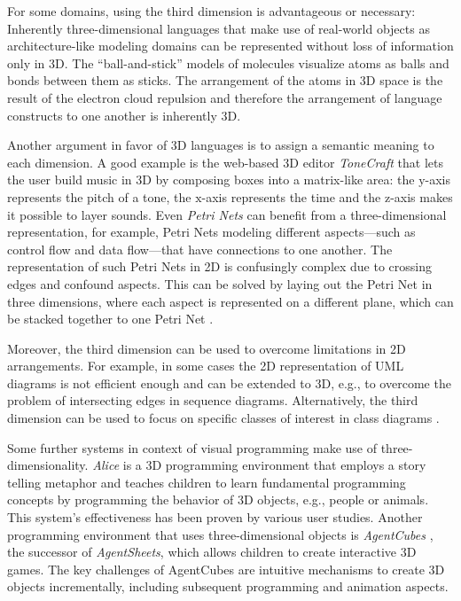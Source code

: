 \documentclass[a4paper]{article}
\begin{document}
For some domains, using the third dimension is advantageous or necessary: Inherently three-dimensional languages that make use of real-world objects as architecture-like modeling domains can be represented without loss of information only in 3D. The ``ball-and-stick'' models of molecules visualize atoms as balls and bonds between them as sticks. The arrangement of the atoms in 3D space is the result of the electron cloud repulsion and therefore the arrangement of language constructs to one another is inherently 3D.

Another argument in favor of 3D languages is to assign a semantic meaning to each dimension. A good example is the web-based 3D editor \emph{ToneCraft} \cite{tonecraft} that lets the user build music in 3D by composing boxes into a matrix-like area: the $\mathrm{y}$-axis represents the pitch of a tone, the $\mathrm{x}$-axis represents the time and the $\mathrm{z}$-axis makes it possible to layer sounds. Even \emph{Petri Nets} can benefit from a three-dimensional representation, for example, Petri Nets modeling different aspects---such as control flow and data flow---that have connections to one another. The representation of such Petri Nets in 2D is confusingly complex due to crossing edges and confound aspects. This can be solved by laying out the Petri Net in three dimensions, where each aspect is represented on a different plane, which can be stacked together to one Petri Net \cite{Roel07}.

Moreover, the third dimension can be used to overcome limitations in 2D arrangements. For example, in some cases the 2D representation of UML diagrams is not efficient enough and can be extended to 3D, e.g., to overcome the problem of intersecting edges in sequence diagrams. Alternatively, the third dimension can be used to focus on specific classes of interest in class diagrams \cite{GRR99}.

Some further systems in context of visual programming make use of three-dimensionality.
\emph{Alice} \cite{KP07} is a 3D programming environment that employs a story telling metaphor and teaches children to learn fundamental programming concepts by programming the behavior of 3D objects, e.g., people or animals. This system's effectiveness has been proven by various user studies. Another programming environment that uses three-dimensional objects is \emph{AgentCubes} \cite{IRW09}, the successor of \emph{AgentSheets}, which allows children to create interactive 3D games. The key challenges of AgentCubes are intuitive mechanisms to create 3D objects incrementally, including subsequent programming and animation aspects.
\end{document}
